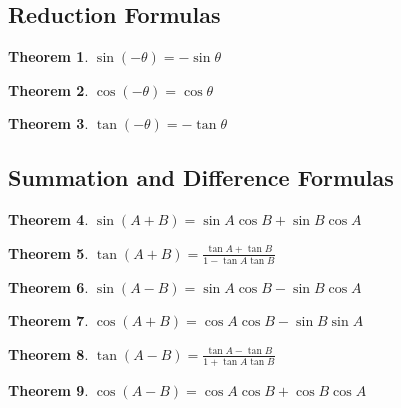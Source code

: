 \documentclass[10pt]{report}
\newtheorem{thm3}{Theorem}[subsection]
\begin{document}
\subsection{Reduction Formulas}
\begin{thm3}$\sin(- \theta) = - \sin \theta$\end{thm3}
\begin{thm3}$\cos(-\theta) = \cos \theta$\end{thm3}
\begin{thm3}$\tan(- \theta) = -\tan \theta$\end{thm3}
\subsection{Summation and Difference Formulas}
\begin{thm3}$\sin(A + B) = \sin A\cos B + \sin B\cos A$\end{thm3}
\begin{thm3}$\tan(A+B)=\frac{\tan A+\tan B}{1-\tan A\tan B}$\end{thm3}
\begin{thm3}$\sin(A - B)=\sin A\cos B-\sin B\cos A$\end{thm3}
\begin{thm3}$\cos(A + B)=\cos A\cos B- \sin B\sin A$\end{thm3}
\begin{thm3}$\tan(A-B)=\frac{\tan A- \tan B}{1+\tan A\tan B}$\end{thm3}
\begin{thm3}$\cos(A - B)=\cos A\cos B+\cos B\cos A$\end{thm3}
\end{document}
